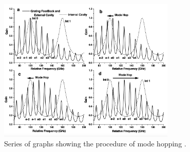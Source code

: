 \noindent

\begin{figure}
    \centering
    \includegraphics[width=0.75\textwidth]{modehops.png}
    \caption{Series of graphs showing the procedure of mode hopping \cite{V60}.}
    \label{fig:modehops}
  \end{figure}
